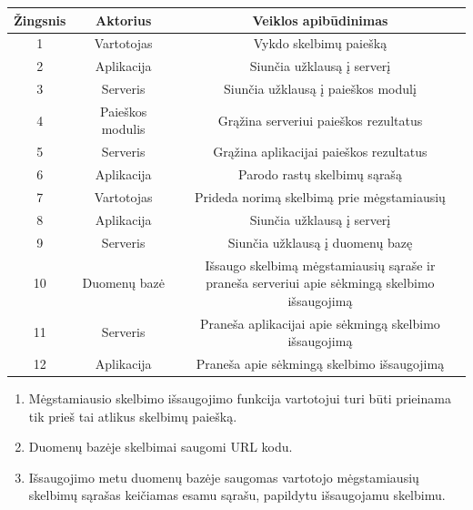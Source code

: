 \documentclass[12pt]{article}
\begin{document}
		\begin{center}
		\begin{tabular}{ | c | c | c | }
			\hline
			Žingsnis & Aktorius         & Veiklos apibūdinimas \\ \hline
			1        & Vartotojas       & Vykdo skelbimų paiešką \\ \hline
			2        & Aplikacija       & Siunčia užklausą į serverį \\ \hline
			3        & Serveris         & Siunčia užklausą į paieškos modulį \\ \hline
			4        & Paieškos modulis & Grąžina serveriui paieškos rezultatus \\ \hline
			5        & Serveris         & Grąžina aplikacijai paieškos rezultatus  \\ \hline
			6        & Aplikacija       & Parodo rastų skelbimų sąrašą \\ \hline
			7        & Vartotojas       & Prideda norimą skelbimą prie mėgstamiausių \\ \hline
			8        & Aplikacija       & Siunčia užklausą į serverį \\ \hline
			9        & Serveris         & Siunčia užklausą į duomenų bazę \\ \hline
			10       & Duomenų bazė     & \makecell{Išsaugo skelbimą mėgstamiausių sąraše ir \\ praneša serveriui apie sėkmingą skelbimo išsaugojimą} \\ \hline
			11       & Serveris         & Praneša aplikacijai apie sėkmingą skelbimo išsaugojimą \\ \hline
			12       & Aplikacija       & Praneša apie sėkmingą skelbimo išsaugojimą \\ \hline
		\end{tabular}
		\end{center}
		\bigskip
		
	\begin{enumerate}[resume,labelindent=10pt,leftmargin=2.2cm]
		\item Mėgstamiausio skelbimo išsaugojimo funkcija vartotojui turi būti prieinama tik prieš tai atlikus skelbimų paiešką.
		\item Duomenų bazėje skelbimai saugomi URL kodu.
		\item Išsaugojimo metu duomenų bazėje saugomas vartotojo mėgstamiausių skelbimų sąrašas keičiamas esamu sąrašu, papildytu išsaugojamu skelbimu.
	\end{enumerate}
	\pagebreak
	
\end{document}
